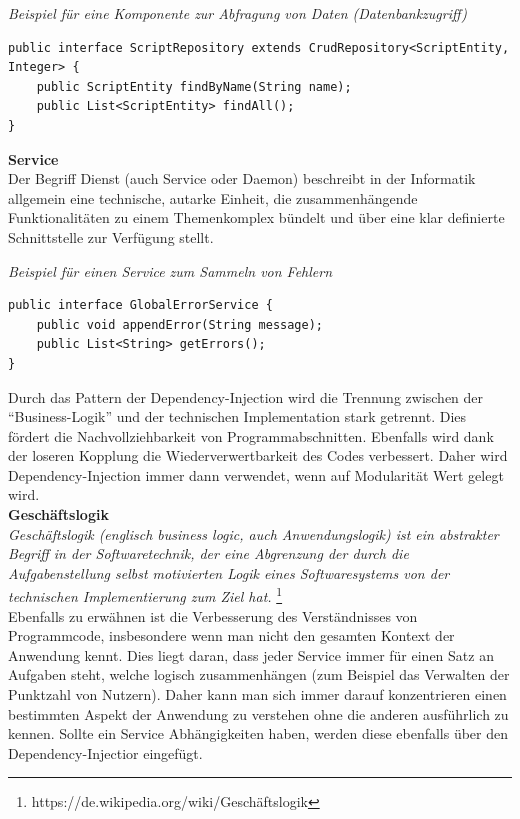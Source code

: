 \begin{minipage}{\textwidth}
\emph{Beispiel für eine Komponente zur Abfragung von Daten (Datenbankzugriff)}
\begin{lstlisting}
public interface ScriptRepository extends CrudRepository<ScriptEntity, Integer> {
	public ScriptEntity findByName(String name);
	public List<ScriptEntity> findAll();
}
\end{lstlisting} 
\end{minipage}

\newpage
\textbf{Service}\\
Der Begriff Dienst (auch Service oder Daemon) beschreibt in der Informatik allgemein eine technische, autarke Einheit, die zusammenhängende Funktionalitäten zu einem Themenkomplex bündelt und über eine klar definierte Schnittstelle zur Verfügung stellt.\\
 
\begin{minipage}{\textwidth}
\emph{Beispiel für einen Service zum Sammeln von Fehlern}
\begin{lstlisting}
public interface GlobalErrorService {
	public void appendError(String message);
	public List<String> getErrors();
}
\end{lstlisting}
\end{minipage}

Durch das Pattern der Dependency-Injection wird die Trennung zwischen der ``Business-Logik'' und der technischen Implementation stark getrennt. Dies fördert die Nachvollziehbarkeit von Programmabschnitten. Ebenfalls wird dank der loseren Kopplung die Wiederverwertbarkeit des Codes verbessert. Daher wird Dependency-Injection immer dann verwendet, wenn auf Modularität Wert gelegt wird. \\


\textbf{Geschäftslogik} \\
\emph{\glqq   
Geschäftslogik (englisch business logic, auch Anwendungslogik) ist ein abstrakter Begriff in der Softwaretechnik, der eine Abgrenzung der durch die Aufgabenstellung selbst motivierten Logik eines Softwaresystems von der technischen Implementierung zum Ziel hat.
\grqq} \footnote{https://de.wikipedia.org/wiki/Geschäftslogik} \\

Ebenfalls zu erwähnen ist die Verbesserung des Verständnisses von Programmcode, insbesondere wenn man nicht den gesamten Kontext der Anwendung kennt. Dies liegt daran, dass jeder Service immer für einen Satz an Aufgaben steht, welche logisch zusammenhängen (zum Beispiel das Verwalten der Punktzahl von Nutzern). Daher kann man sich immer darauf konzentrieren einen bestimmten Aspekt der Anwendung zu verstehen ohne die anderen ausführlich zu kennen. Sollte ein Service Abhängigkeiten haben, werden diese ebenfalls über den Dependency-Injectior eingefügt. \\

